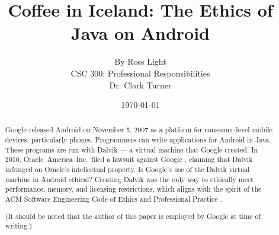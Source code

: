 \documentclass[11pt]{article}
\begin{document}
\title{\vfill Coffee in Iceland: The Ethics of Java on Android} %
\author{
By Ross Light \vspace{10pt} \\
CSC 300: Professional Responsibilities  \vspace{10pt} \\
Dr. Clark Turner \vspace{10pt} \\
}
\date{\today} %

\maketitle

\vfill  %
\begin{abstract} %

Google released Android on November 5, 2007 \cite{open-handset-alliance-ann} as
a platform for consumer-level mobile devices, particularly phones.  Programmers
can write applications for Android in Java.  These programs are run with Dalvik
--- a virtual machine that Google created.  In 2010, Oracle~America~Inc.\ filed
a lawsuit against Google \cite{oracle-lawsuit}, claiming that Dalvik infringed
on Oracle's intellectual property.  Is Google's use of the Dalvik virtual
machine in Android ethical?  Creating Dalvik was the only way to ethically meet
performance, memory, and licensing restrictions, which aligns with the spirit of
the ACM Software Engineering Code of Ethics and Professional Practice
\cite{secode}.

(It should be noted that the author of this paper is employed by Google at time
of writing.)

\end{abstract} %

\thispagestyle{empty} %
\newpage

\thispagestyle{empty}  %
\tableofcontents

\newpage
\end{document}
